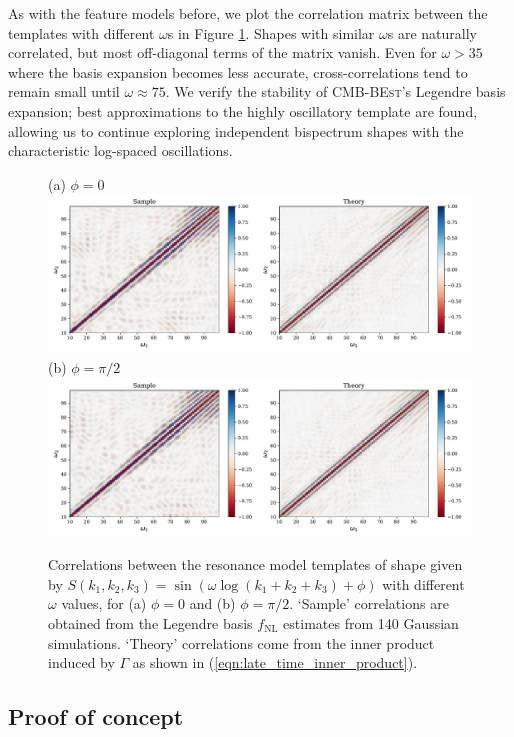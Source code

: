 As with the feature models before, we plot the correlation matrix between the templates with different $\omega$s in Figure \ref{fig:sinlog_template_correlations}. Shapes with similar $\omega$s are naturally correlated, but most off-diagonal terms of the matrix vanish. Even for $\omega > 35$ where the basis expansion becomes less accurate, cross-correlations tend to remain small until $\omega \approx 75$. We verify the stability of \textsc{CMB-BEst}'s Legendre basis expansion; best approximations to the highly oscillatory template are found, allowing us to continue exploring independent bispectrum shapes with the characteristic log-spaced oscillations.

\begin{figure}[htbp!] 
	\centering
	(a) $ \phi=0 $
	\includegraphics[width=\textwidth]{sinlog_template_correlations_new.pdf}
	(b) $ \phi=\pi/2 $
	\includegraphics[width=\textwidth]{coslog_template_correlations_new.pdf}
	\caption{Correlations between the resonance model templates of shape given by ${S(k_1,k_2,k_3) = \sin(\omega\log(k_1+k_2+k_3)+\phi)}$ with different $\omega$ values, for (a) $\phi = 0$ and (b) $\phi=\pi/2$. `Sample' correlations are obtained from the Legendre basis $f_\text{NL}$ estimates from 140 Gaussian simulations. `Theory' correlations come from the inner product induced by $\Gamma$ as shown in (\ref{eqn:late_time_inner_product}).}
	\label{fig:sinlog_template_correlations}
\end{figure}


\subsection{Proof of concept} \label{section:proof_of_concept}


